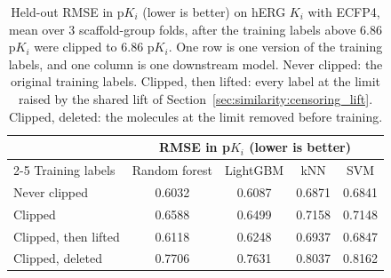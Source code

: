 \begin{table}[htbp]
\centering
\small
\begin{tabular}{@{}lcccc@{}}
\toprule
 & \multicolumn{4}{c}{RMSE in p$K_i$ (lower is better)} \\
\cmidrule(l){2-5}
Training labels & Random forest & LightGBM & kNN & SVM \\
\midrule
Never clipped & 0.6032 & 0.6087 & 0.6871 & 0.6841 \\
Clipped & 0.6588 & 0.6499 & 0.7158 & 0.7148 \\
Clipped, then lifted & 0.6118 & 0.6248 & 0.6937 & 0.6847 \\
Clipped, deleted & 0.7706 & 0.7631 & 0.8037 & 0.8162 \\
\bottomrule
\end{tabular}
\caption[Correcting clipped training labels on hERG $K_i$ with ECFP4]{Held-out RMSE in p$K_i$ (lower is better) on hERG $K_i$ with ECFP4, mean over 3 scaffold-group folds, after the training labels above 6.86 p$K_i$ were clipped to 6.86 p$K_i$. One row is one version of the training labels, and one column is one downstream model. Never clipped: the original training labels. Clipped, then lifted: every label at the limit raised by the shared lift of Section~\ref{sec:similarity:censoring_lift}. Clipped, deleted: the molecules at the limit removed before training.}
\label{tab:ch6prelim_censor_ecfp4}
\end{table}

